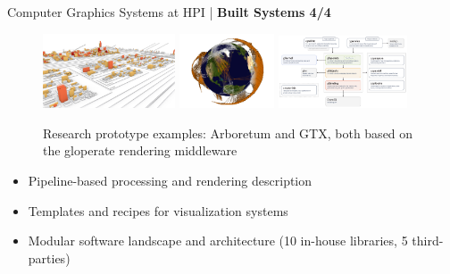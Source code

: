 \begin{frame}{Computer Graphics Systems at HPI | \textbf{Built Systems 4/4}}
	
	\begin{figure}
		\includegraphics[width=0.35\textwidth]{images/arboretum}
		\hfill
		\includegraphics[width=0.25\textwidth]{images/gtx}
		\hfill
		\includegraphics[width=0.34\textwidth]{images/middleware}
		\caption{Research prototype examples: Arboretum and GTX, both based on the gloperate rendering middleware}
	\end{figure}
	
	
	\begin{itemize}
		\item Pipeline-based processing and rendering description
		\item Templates and recipes for visualization systems
		\item Modular software landscape and architecture (10 in-house libraries, 5 third-parties)
	\end{itemize}
	
\end{frame}